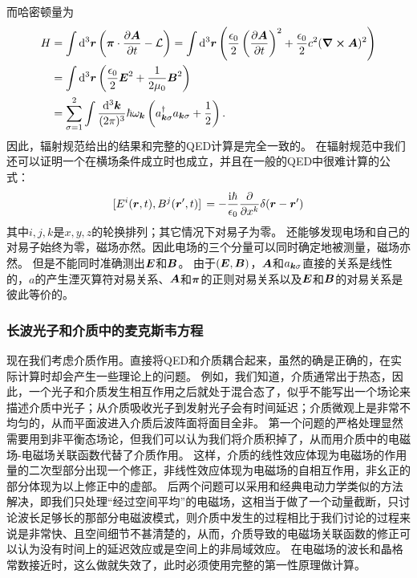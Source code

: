 \documentclass[UTF8, a4paper]{ctexart}
\newcommand*{\ii}{\mathrm{i}}
\begin{document}
而哈密顿量为
\begin{equation}
    \begin{aligned}
        H &= \int \dd[3]{\vb*{r}} \left(\vb*{\pi} \cdot \pdv{\vb*{A}}{t} - \mathcal{L} \right) = \int \dd[3]{\vb*{r}} \left( \frac{\epsilon_0}{2} \left(\pdv{\vb*{A}}{t}\right)^2 + \frac{\epsilon_0}{2} c^2 (\curl{\vb*{A}})^2 \right) \\
        &= \int \dd[3]{\vb*{r}} \left( \frac{\epsilon_0}{2} \vb*{E}^2 + \frac{1}{2\mu_0} \vb*{B}^2 \right) \\
        &= \sum_{\sigma=1}^2 \int \frac{\dd[3]{\vb*{k}}}{(2\pi)^3} \hbar \omega_{\vb*{k}} \left(a^\dagger_{\vb*{k} \sigma} a_{\vb*{k} \sigma} + \frac{1}{2} \right).
    \end{aligned}
\end{equation}
因此，辐射规范给出的结果和完整的QED计算是完全一致的。
在辐射规范中我们还可以证明一个在横场条件成立时也成立，并且在一般的QED中很难计算的公式：
\begin{equation}
    \comm*{E^i(\vb*{r}, t)}{B^j(\vb*{r}', t)} = - \frac{\ii \hbar}{\epsilon_0} \pdv{x^k} \delta(\vb*{r} - \vb*{r}')
\end{equation}
其中$i, j, k$是$x, y, z$的轮换排列；其它情况下对易子为零。
还能够发现电场和自己的对易子始终为零，磁场亦然。因此电场的三个分量可以同时确定地被测量，磁场亦然。
但是不能同时准确测出$\vb*{E}$和$\vb*{B}$。
由于$(\vb*{E}, \vb*{B})$，$\vb*{A}$和$a_{\vb*{k} \sigma}$直接的关系是线性的，$a$的产生湮灭算符对易关系、$\vb*{A}$和$\vb*{\pi}$的正则对易关系以及$\vb*{E}$和$\vb*{B}$的对易关系是彼此等价的。

\subsubsection{长波光子和介质中的麦克斯韦方程}

现在我们考虑介质作用。直接将QED和介质耦合起来，虽然的确是正确的，在实际计算时却会产生一些理论上的问题。
例如，我们知道，介质通常出于热态，因此，一个光子和介质发生相互作用之后就处于混合态了，似乎不能写出一个场论来描述介质中光子；从介质吸收光子到发射光子会有时间延迟；介质微观上是非常不均匀的，从而平面波进入介质后波阵面将面目全非。
第一个问题的严格处理显然需要用到非平衡态场论，但我们可以认为我们将介质积掉了，从而用介质中的电磁场-电磁场关联函数代替了介质作用。
这样，介质的线性效应体现为电磁场的作用量的二次型部分出现一个修正，非线性效应体现为电磁场的自相互作用，非幺正的部分体现为以上修正中的虚部。
后两个问题可以采用和经典电动力学类似的方法解决，即我们只处理“经过空间平均”的电磁场，这相当于做了一个动量截断，只讨论波长足够长的那部分电磁波模式，则介质中发生的过程相比于我们讨论的过程来说是非常快、且空间细节不甚清楚的，从而，介质导致的电磁场关联函数的修正可以认为没有时间上的延迟效应或是空间上的非局域效应。
在电磁场的波长和晶格常数接近时，这么做就失效了，此时必须使用完整的第一性原理做计算。
\end{document}
